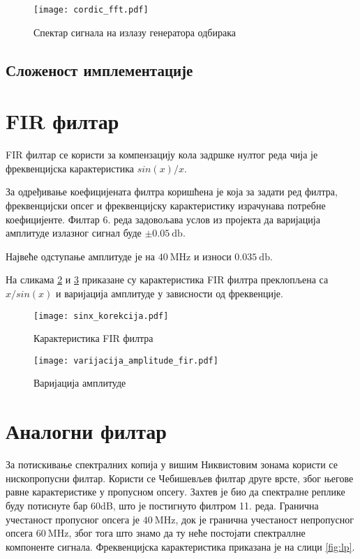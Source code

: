 \documentclass[conference]{IEEEJERM}
\begin{document}
\begin{figure}[t]
	\centering
	\texttt{[image: cordic\_fft.pdf]}
	\caption{Спектар сигнала на излазу генератора одбирака}
	\label{fig:cordic_fft}
\end{figure} 


\subsection{Сложеност имплементације}


\section{FIR филтар}
FIR филтар се користи за компензацију кола задршке нултог реда чија је фреквенцијска карактеристика $sin(x)/x$.

За одређивање коефицијената филтра коришћена је  која за задати ред филтра, 
фреквенцијски опсег и фреквенцијску карактеристику израчунава потребне коефицијенте. 
Филтар 6. реда задовољава услов из пројекта да варијација амплитуде излазног сигнал буде $\pm \SI{0.05}{\decibel}$.

Највеће одступање амплитуде је на $\SI{40}{\mega\hertz}$ и износи $\SI{0.035}{\decibel}$.

На сликама \ref{fig:fir} и \ref{fig:ampl_var} приказане су карактеристика FIR филтра преклопљена са $x/sin(x)$ и варијација амплитуде у зависности од фреквенције. 

\begin{figure}
	\centering
	\texttt{[image: sinx\_korekcija.pdf]}
	\caption{Карактеристика FIR филтра}
	\label{fig:fir}
\end{figure}

\begin{figure}
	\centering
	\texttt{[image: varijacija\_amplitude\_fir.pdf]}
	\caption{Варијација амплитуде}
	\label{fig:ampl_var}
\end{figure}



 
\section{Аналогни филтар}

За потискивање спектралних копија у вишим Никвистовим зонама користи се нископропусни филтар.
Користи се Чебишевљев филтар друге врсте, због његове равне карактеристике у пропусном опсегу.
Захтев је био да спектралне реплике буду потиснуте бар 60dB, што је постигнуто филтром 11. реда. 
Гранична учестаност пропусног опсега је $\SI{40}{\mega\hertz}$, док је гранична учестаност непропусног опсега $\SI{60}{\mega\hertz}$, 
због тога што знамо да ту неће постојати спектраллне компоненте сигнала. Фреквенцијска карактеристика приказана је на слици \ref{fig:lp}.
\end{document}
